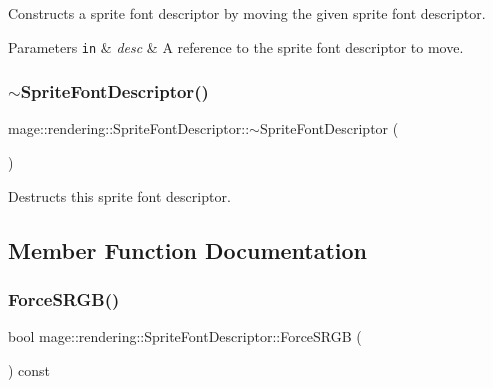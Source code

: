 Constructs a sprite font descriptor by moving the given sprite font descriptor.


\begin{DoxyParams}[1]{Parameters}
\mbox{\tt in}  & {\em desc} & A reference to the sprite font descriptor to move. \\
\hline
\end{DoxyParams}
\hypertarget{classmage_1_1rendering_1_1_sprite_font_descriptor_adef19c1e38ed5a685578a855b17c08bc}{}\label{classmage_1_1rendering_1_1_sprite_font_descriptor_adef19c1e38ed5a685578a855b17c08bc} 
\subsubsection{\texorpdfstring{$\sim$\+Sprite\+Font\+Descriptor()}{~SpriteFontDescriptor()}}
{\footnotesize\ttfamily mage\+::rendering\+::\+Sprite\+Font\+Descriptor\+::$\sim$\+Sprite\+Font\+Descriptor (\begin{DoxyParamCaption}{ }\end{DoxyParamCaption})\hspace{0.3cm}{\ttfamily [default]}}

Destructs this sprite font descriptor. 

\subsection{Member Function Documentation}
\hypertarget{classmage_1_1rendering_1_1_sprite_font_descriptor_a4d7ab52dc3380f1c88b847248825438d}{}\label{classmage_1_1rendering_1_1_sprite_font_descriptor_a4d7ab52dc3380f1c88b847248825438d} 
\subsubsection{\texorpdfstring{Force\+S\+R\+G\+B()}{ForceSRGB()}}
{\footnotesize\ttfamily bool mage\+::rendering\+::\+Sprite\+Font\+Descriptor\+::\+Force\+S\+R\+GB (\begin{DoxyParamCaption}{ }\end{DoxyParamCaption}) const\hspace{0.3cm}{\ttfamily [noexcept]}}

